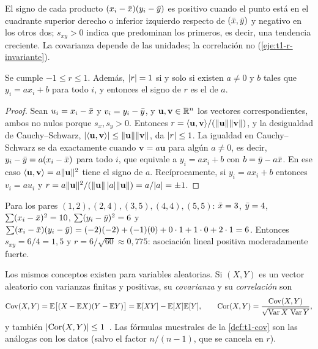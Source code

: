 El signo de cada producto $(x_i-\bar{x})(y_i-\bar{y})$ es positivo cuando el punto está en el cuadrante superior derecho o inferior izquierdo respecto de $(\bar{x},\bar{y})$ y negativo en los otros dos; $s_{xy}>0$ indica que predominan los primeros, es decir, una tendencia creciente. La covarianza depende de las unidades; la correlación no (\cref{eje:t1-r-invariante}).

\begin{teorema}\label{teo:t1-r}
Se cumple $-1\le r\le 1$. Además, $\lvert r\rvert=1$ si y solo si existen $a\neq 0$ y $b$ tales que $y_i=ax_i+b$ para todo $i$, y entonces el signo de $r$ es el de $a$.
\end{teorema}

\begin{proof}
Sean $u_i=x_i-\bar{x}$ y $v_i=y_i-\bar{y}$, y $\mathbf u,\mathbf v\in\mathbb{R}^{n}$ los vectores correspondientes, ambos no nulos porque $s_x,s_y>0$. Entonces $r=\langle\mathbf u,\mathbf v\rangle/(\lVert\mathbf u\rVert\lVert\mathbf v\rVert)$, y la desigualdad de Cauchy--Schwarz, $\lvert\langle\mathbf u,\mathbf v\rangle\rvert\le\lVert\mathbf u\rVert\lVert\mathbf v\rVert$, da $\lvert r\rvert\le 1$. La igualdad en Cauchy--Schwarz se da exactamente cuando $\mathbf v=a\mathbf u$ para algún $a\neq0$, es decir, $y_i-\bar{y}=a(x_i-\bar{x})$ para todo $i$, que equivale a $y_i=ax_i+b$ con $b=\bar{y}-a\bar{x}$. En ese caso $\langle\mathbf u,\mathbf v\rangle=a\lVert\mathbf u\rVert^{2}$ tiene el signo de $a$. Recíprocamente, si $y_i=ax_i+b$ entonces $v_i=au_i$ y $r=a\lVert\mathbf u\rVert^{2}/(\lVert\mathbf u\rVert\,\lvert a\rvert\lVert\mathbf u\rVert)=a/\lvert a\rvert=\pm1$.
\end{proof}

\begin{ejemplo}\label{ej:t1-r}
Para los pares $(1,2),(2,4),(3,5),(4,4),(5,5)$: $\bar{x}=3$, $\bar{y}=4$, $\sum(x_i-\bar{x})^{2}=10$, $\sum(y_i-\bar{y})^{2}=6$ y $\sum(x_i-\bar{x})(y_i-\bar{y})=(-2)(-2)+(-1)(0)+0\cdot1+1\cdot0+2\cdot1=6$. Entonces $s_{xy}=6/4=1{,}5$ y $r=6/\sqrt{60}\approx 0{,}775$: asociación lineal positiva moderadamente fuerte.
\end{ejemplo}

Los mismos conceptos existen para variables aleatorias. Si $(X,Y)$ es un vector aleatorio con varianzas finitas y positivas, su \emph{covarianza} y su \emph{correlación} son
\[
\operatorname{Cov}(X,Y)=\mathbb{E}\bigl[(X-\mathbb{E} X)(Y-\mathbb{E} Y)\bigr]=\mathbb{E}[XY]-\mathbb{E}[X]\mathbb{E}[Y],
\qquad
\operatorname{Cor}(X,Y)=\frac{\operatorname{Cov}(X,Y)}{\sqrt{\operatorname{Var} X\,\operatorname{Var} Y}},
\]
y también $\lvert\operatorname{Cor}(X,Y)\rvert\le1$~\cite[§7.3]{bh}. Las fórmulas muestrales de la \cref{def:t1-cov} son las análogas con los datos (salvo el factor $n/(n-1)$, que se cancela en $r$).

